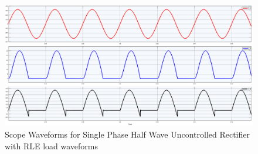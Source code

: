 \begin{figure}[h]
    \centering
    \includegraphics[width=1\textwidth]{images/experiment-1/circuit-scope-simulation-04.png}
    \caption{Scope Waveforms for Single Phase Half Wave Uncontrolled Rectifier with RLE load waveforms}
    \label{Fig_waveform_single-phase-half-wave-uncontrolled-rectifier-with-RLE-load}
\end{figure}

\pagebreak

